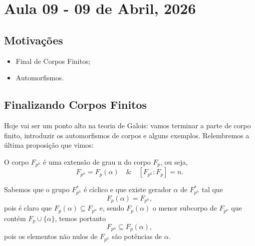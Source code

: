 \documentclass[../algebraIII_notes.tex]{subfiles}
\begin{document}
\section{Aula 09 - 09 de Abril, 2026}
\subsection{Motivações}
\begin{itemize}
	\item Final de Corpos Finitos;
	\item Automorfismos.
\end{itemize}
\subsection{Finalizando Corpos Finitos}
Hoje vai ser um ponto alto na teoria de Galois: vamos terminar a parte de corpo finito, introduzir os automorfismos de corpos e alguns exemplos. Relembremos a última proposição que vimos:
\begin{prop*}
	O corpo \(F_{p^{n}}\) é uma extensão de grau n do corpo \(F_{p}\), ou seja,
	\[
		F_{p^{n}} = F_{p}(\alpha ) \quad\&\quad [F_{p^{n}}:F_{p}] = n.
	\]
\end{prop*}
\begin{proof*}
	Sabemos que o grupo \(F_{p^{n}}^{*}\) é cíclico e que existe gerador \(\alpha \) de \(F_{p^{n}}^{*}\) tal que
	\[
		F_{p}(\alpha ) = F_{p^{n}},
	\]
	pois é claro que \(F_{p}(\alpha )\subseteq F_{p^{n}}\) e, sendo \(F_{p}(\alpha )\) o menor subcorpo de \(F_{p^{n}}\) que contém \(F_{p}\cup \{\alpha \}\), temos portanto
	\[
		F_{p^{n}}\subseteq F_{p}(\alpha ),
	\]
	pois os elementos não nulos de \(F_{p^{n}}\) são potências de \(\alpha \). \qedsymbol
\end{proof*}
\end{document}
